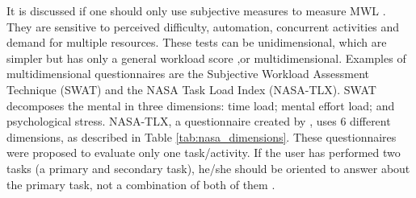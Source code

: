         It is discussed if one should only use subjective measures to measure MWL \cite{sanders1998human, stanton2004handbook}. They are sensitive to perceived difficulty, automation, concurrent activities and demand for multiple resources. These tests can be unidimensional, which are simpler but has only a general workload score \cite{stanton2004handbook},or multidimensional. Examples of multidimensional questionnaires are the Subjective Workload Assessment Technique (SWAT) and the NASA Task Load Index (NASA-TLX). SWAT decomposes the mental in three dimensions: time load; mental effort load; and psychological stress. NASA-TLX, a questionnaire created by , uses 6 different dimensions, as described in Table \ref{tab:nasa_dimensions}. These questionnaires were proposed to evaluate only one task/activity. If the user has performed two tasks (a primary and secondary task), he/she should be oriented to answer about the primary task, not a combination of both of them \cite{sanders1998human}.
        

